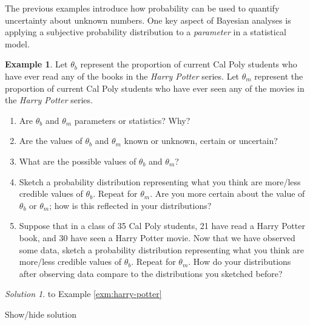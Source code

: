 \documentclass[
]{book}
\providecommand{\tightlist}{%
  \setlength{\itemsep}{0pt}\setlength{\parskip}{0pt}}
\theoremstyle{definition}
\theoremstyle{definition}
\newtheorem{example}{Example}[chapter]
\theoremstyle{definition}
\theoremstyle{remark}
\newtheorem*{solution}{Solution}
\begin{document}
The previous examples introduce how probability can be used to quantify uncertainty about unknown numbers. One key aspect of Bayesian analyses is applying a subjective probability distribution to a \emph{parameter} in a statistical model.

\begin{example}
\protect\hypertarget{exm:harry-potter}{}{\label{exm:harry-potter} }
Let \(\theta_b\) represent the proportion of current Cal Poly students who have ever read any of the books in the \emph{Harry Potter} series. Let \(\theta_m\) represent the proportion of current Cal Poly students who have ever seen any of the movies in the \emph{Harry Potter} series.
\end{example}

\begin{enumerate}
\def\labelenumi{\arabic{enumi}.}
\tightlist
\item
  Are \(\theta_b\) and \(\theta_m\) parameters or statistics? Why?
\item
  Are the values of \(\theta_b\) and \(\theta_m\) known or unknown, certain or uncertain?
\item
  What are the possible values of \(\theta_b\) and \(\theta_m\)?
\item
  Sketch a probability distribution representing what you think are more/less credible values of \(\theta_b\). Repeat for \(\theta_m\). Are you more certain about the value of \(\theta_b\) or \(\theta_m\); how is this reflected in your distributions?
\item
  Suppose that in a class of 35 Cal Poly students, 21 have read a Harry Potter book, and 30 have seen a Harry Potter movie. Now that we have observed some data, sketch a probability distribution representing what you think are more/less credible values of \(\theta_b\). Repeat for \(\theta_m\). How do your distributions after observing data compare to the distributions you sketched before?
\end{enumerate}

\begin{solution}
{}
to Example \ref{exm:harry-potter}
\end{solution}

Show/hide solution
\end{document}
